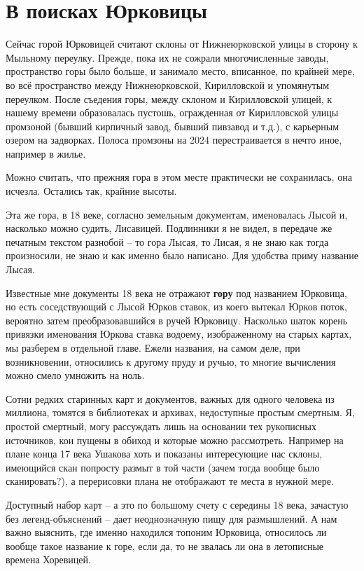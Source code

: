 \chapter{В поисках Юрковицы}

Сейчас горой Юрковицей считают склоны от Нижнеюрковской улицы в сторону к Мыльному переулку. Прежде, пока их не сожрали многочисленные заводы, пространство горы было больше, и занимало место, вписанное, по крайней мере, во всё пространство между Нижнеюрковской, Кирилловской и упомянутым переулком. После съедения горы, между склоном и Кирилловской улицей, к нашему времени образовалась пустошь, огражденная от Кирилловской улицы промзоной (бывший кирпичный завод, бывший пивзавод и т.д.), с карьерным озером на задворках. Полоса промзоны на 2024 перестраивается в нечто иное, например в жилье.

Можно считать, что прежняя гора в этом месте практически не сохранилась, она исчезла. Остались так, крайние высоты.

Эта же гора, в 18 веке, согласно земельным документам, именовалась Лысой и, насколько можно судить, Лисавицей. Подлинники я не видел, в передаче же печатным текстом разнобой – то гора Лысая, то Лисая, я не знаю как тогда произносили, не знаю и как именно было написано. Для удобства приму название Лысая.

Известные мне документы 18 века не отражают \textbf{гору} под названием Юрковица, но есть соседствующий с Лысой Юрков ставок, из коего вытекал Юрков поток, вероятно затем преобразовавшийся в ручей Юрковицу. Насколько шаток корень привязки именования Юркова ставка водоему, изображенному на старых картах, мы разберем в отдельной главе. Ежели названия, на самом деле, при возникновении, относились к другому пруду и ручью, то многие вычисления можно смело умножить на ноль.

Сотни редких старинных карт и документов, важных для одного человека из миллиона, томятся в библиотеках и архивах, недоступные простым смертным. Я, простой смертный, могу рассуждать лишь на основании тех рукописных источников, кои пущены в обиход и которые можно рассмотреть. Например на плане конца 17 века Ушакова хоть и показаны интересующие нас склоны, имеющийся скан попросту размыт в той части (зачем тогда вообще было сканировать?), а перерисовки плана не отображают те места в нужной мере.

Доступный набор карт – а это по большому счету с середины 18 века, зачастую без легенд-объяснений – дает неоднозначную пищу для размышлений. А нам важно выяснить, где именно находился топоним Юрковица, относилось ли вообще такое название к горе, если да, то не звалась ли она в летописные времена Хоревицей.

